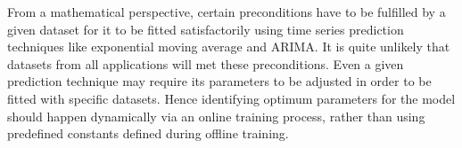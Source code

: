 From a mathematical perspective, certain preconditions have to be fulfilled by a given dataset for it to be fitted satisfactorily using time series prediction techniques like exponential moving average and ARIMA. It is quite unlikely that datasets from all applications will met these preconditions. Even a given prediction technique may require its parameters to be adjusted in order to be fitted with specific datasets. Hence identifying optimum parameters for the model should happen dynamically via an online training process, rather than using predefined constants defined during offline training.